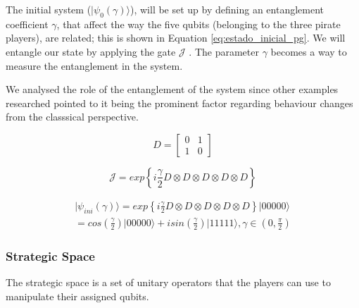 \documentclass[10pt,twocolumn]{llncs}
\begin{document}
The initial system ($\vert \psi_{0}(\gamma) \rangle$), will be set up by defining an entanglement coefficient $\gamma$, that affect the way the five qubits (belonging to the three pirate players), are related; this is shown in Equation \ref{eq:estado_inicial_pg}. 
We will entangle our state by applying the gate $\mathcal{J}$ \cite{Letters2002}. The parameter $\gamma$ becomes a way to measure the entanglement in the system\cite{Eisert2008}. 

We analysed the role of the entanglement of the system since other examples researched pointed to it being the prominent factor regarding behaviour changes from the classsical perspective\cite{Fra2011a}\cite{Fra2011}\cite{Letters2002}\cite{Khan2011}\cite{Ricketts2006}. 


\begin{equation}
D=\left[\begin{array}{cc}
0 & 1\\
1 & 0
\end{array}\right]
\label{eq:DDDDDDDrica}
\end{equation} 



\begin{equation}
\mathcal{J}=exp\left\{ i\frac{\gamma}{2} D \otimes D \otimes D \otimes D 
\otimes D
\right\} 
\label{eq:matrix_exponencial_esoterica}
\end{equation} 

\begin{center}
\begin{equation}
\begin{split}
\vert\psi_{ini}(\gamma)\rangle=exp\left\{ i\frac{\gamma}{2} D \otimes D \otimes D \otimes D 
\otimes D\right\} \vert00000\rangle \\
=cos(\frac{\gamma}{2})\vert00000\rangle+isin(\frac{\gamma}{2})\vert11111\rangle,\gamma\in(0,\frac{\pi}{2})
 \end{split}
\label{eq:estado_inicial_pg}
\end{equation}
\end{center}



\subsubsection{Strategic Space}
\label{subsec:strategic_space}

The strategic space is a set of unitary operators that the players can use to manipulate their assigned qubits.
\end{document}
